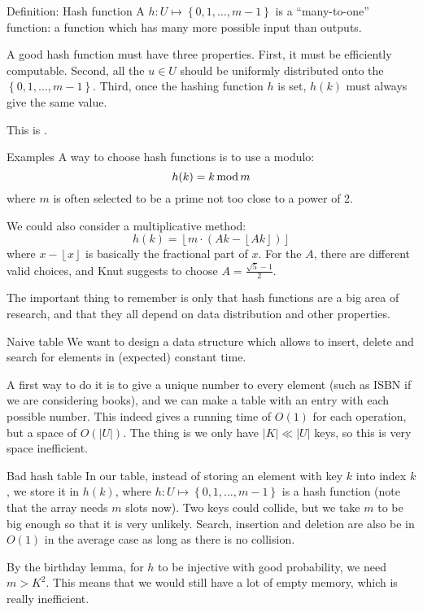 \documentclass[a4paper]{article}
\begin{document}
\begin{parag}{Definition: Hash function}
    A  $h: U \mapsto \left\{0, 1, \ldots, m-1\right\}$ is a ``many-to-one'' function: a function which has many more possible input than outputs.

    A good hash function must have three properties. First, it must be efficiently computable. Second, all the $u \in U$ should be uniformly distributed onto the $\left\{0, 1, \ldots, m-1\right\}$. Third, once the hashing function $h$ is set, $h\left(k\right)$ must always give the same value.
    
    This is .

    \begin{subparag}{Examples}
        A way to choose hash functions is to use a modulo: 
        \[h\left(k\right) = k \Mod m\]
        where $m$ is often selected to be a prime not too close to a power of 2.

        We could also consider a multiplicative method: 
        \[h\left(k\right) = \left\lfloor m \cdot \left(Ak - \left\lfloor Ak \right\rfloor \right) \right\rfloor \]
        where $x - \left\lfloor x \right\rfloor $ is basically the fractional part of $x$. For the $A$, there are different valid choices, and Knut suggests to choose $A = \frac{\sqrt{5} - 1}{2}$.

        The important thing to remember is only that hash functions are a big area of research, and that they all depend on data distribution and other properties.
    \end{subparag}
\end{parag}


\begin{parag}{Naive table}
    We want to design a data structure which allows to insert, delete and search for elements in (expected) constant time.

    A first way to do it is to give a unique number to every element (such as ISBN if we are considering books), and we can make a table with an entry with each possible number. This indeed gives a running time of $O\left(1\right)$ for each operation, but a space of $O\left(\left|U\right|\right)$. The thing is we only have $\left|K\right| \ll \left|U\right|$ keys, so this is very space inefficient.
\end{parag}

\begin{parag}{Bad hash table}
    In our table, instead of storing an element with key $k$ into index $k$, we store it in $h\left(k\right)$, where $h: U \mapsto \left\{0, 1, \ldots, m-1\right\}$ is a hash function (note that the array needs $m$ slots now). Two keys could collide, but we take $m$ to be big enough so that it is very unlikely. Search, insertion and deletion are also be in $O\left(1\right)$ in the average case as long as there is no collision.

     By the birthday lemma, for $h$ to be injective with good probability, we need $m > K^2$. This means that we would still have a lot of empty memory, which is really inefficient.
\end{parag}
\end{document}
